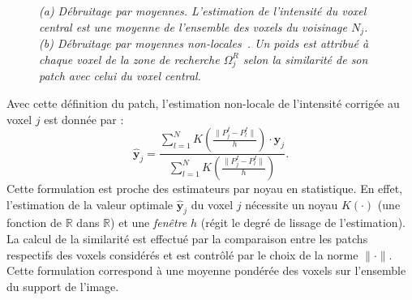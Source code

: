 \begin{figure}[!htbp]
\begin{center}
\end{center}
\caption{\emph{(a) Débruitage par moyennes. L'estimation de l'intensité du voxel central est une moyenne de l'ensemble des voxels du voisinage $N_j$. (b) Débruitage par moyennes non-locales~\cite{Buades:MMS:2005}. Un poids est attribué à chaque voxel de la zone de recherche $\Omega^R_j$ selon la similarité de son patch avec celui du voxel central.}}
\label{fig:mean_filter}
\end{figure}

Avec cette définition du patch, l'estimation non-locale de l'intensité corrigée au voxel $j$ est donnée par : 
\begin{equation}
\mathbf{\hat{y}}_{j} = \frac{\sum_{l=1}^{N} K \left( \frac{\lVert P^{I}_{j} - P^{I}_{l} \rVert}{h} \right) \cdotp \mathbf{y}_{j} }{\sum_{l=1}^{N} K \left(\frac{ \lVert P^{I}_{j} - P^{I}_{l} \rVert}{h} \right)} \label{nlfcm:estimateur:complet}.
\end{equation}
Cette formulation est proche des estimateurs par noyau en statistique.
En effet, l'estimation de la valeur optimale $\mathbf{\hat{y}}_{j}$ du voxel $j$ nécessite un noyau $K(\cdotp)$ (une fonction de $\mathbb{R}$ dans $\mathbb{R}$) et une \emph{fenêtre} $h$ (régit le degré de lissage de l'estimation).
La calcul de la similarité est effectué par la comparaison entre les patchs respectifs des voxels considérés et est contrôlé par le choix de la norme $\lVert \cdotp \rVert$.
Cette formulation correspond à une moyenne pondérée des voxels sur l'ensemble du support de l'image.

